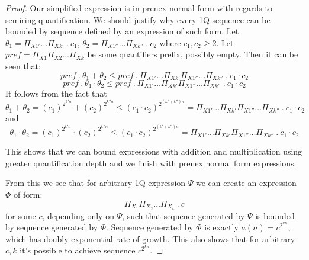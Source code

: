 \documentclass[12pt]{article}
\theoremstyle{definition}
\begin{document}
\begin{proof}
    Our simplified expression is in prenex normal form with regards to semiring quantification. We should justify why every 1Q sequence can be bounded by sequence defined by an expression of such form. Let $\theta_1 = \Pi_{X1'} \ldots \Pi_{Xk'} \ . \ c_1$, $\theta_2 = \Pi_{X1''} \ldots \Pi_{Xk''} \ . \ c_2$ where $c_1, c_2 \geq 2$. Let $pref = \Pi_{X1}\Pi_{X2} \ldots \Pi_{Xk}$ be some quantifiers prefix, possibly empty. Then it can be seen that:
    $$pref \ . \ \theta_1 + \theta_2 \leq pref \ . \ \Pi_{X1'} \ldots \Pi_{Xk'} \Pi_{X1''} \ldots \Pi_{Xk''} \ . \ c_1 \cdot c_2$$
    $$pref \ . \ \theta_1 \cdot \theta_2 \leq pref \ . \ \Pi_{X1'} \ldots \Pi_{Xk'} \Pi_{X1''} \ldots \Pi_{Xk''} \ . \ c_1 \cdot c_2$$
    It follows from the fact that
    $$\theta_1 + \theta_2 = (c_1)^{2^{k'n}} + (c_2)^{2^{k''n}} \leq (c_1 \cdot c_2)^{2^{(k' + k'')n}} = \Pi_{X1'} \ldots \Pi_{Xk'} \Pi_{X1''} \ldots \Pi_{Xk''} \ . \ c_1 \cdot c_2$$
    and
    $$\theta_1 \cdot \theta_2 = (c_1)^{2^{k'n}} \cdot (c_2)^{2^{k''n}} \leq (c_1 \cdot c_2)^{2^{(k' + k'')n}} = \Pi_{X1'} \ldots \Pi_{Xk'} \Pi_{X1''} \ldots \Pi_{Xk''} \ . \ c_1 \cdot c_2$$

    This shows that we can bound expressions with addition and multiplication using greater quantification depth and we finish with prenex normal form expressions.

    From this we see that for arbitrary 1Q expression $\varPsi$ we can create an expression $\varPhi$ of form:
    $$\Pi_{X_1}\Pi_{X_2}\ldots \Pi_{X_k} \ . \ c$$
    for some $c$, depending only on $\varPsi$, such that sequence generated by $\varPsi$ is bounded by sequence generated by $\varPhi$. Sequence generated by $\varPhi$ is exactly $a(n) = c^{2^{kn}}$, which has doubly exponential rate of growth. This also shows that for arbitrary $c, k$ it's possible to achieve sequence $c^{2^{kn}}$.
\end{proof}


\end{document}
